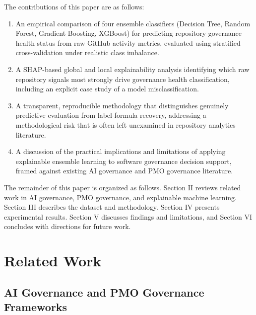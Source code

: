 \documentclass[conference]{IEEEtran}
\begin{document}
The contributions of this paper are as follows:

\begin{enumerate}
\item An empirical comparison of four ensemble classifiers (Decision Tree, Random Forest,
Gradient Boosting, XGBoost) for predicting repository governance health status from
raw GitHub activity metrics, evaluated using stratified cross-validation under
realistic class imbalance.
\item A SHAP-based global and local explainability analysis identifying which raw
repository signals most strongly drive governance health classification, including
an explicit case study of a model misclassification.
\item A transparent, reproducible methodology that distinguishes genuinely predictive
evaluation from label-formula recovery, addressing a methodological risk that is
often left unexamined in repository analytics literature.
\item A discussion of the practical implications and limitations of applying explainable
ensemble learning to software governance decision support, framed against existing
AI governance and PMO governance literature.
\end{enumerate}

The remainder of this paper is organized as follows. Section II reviews related work in
AI governance, PMO governance, and explainable machine learning. Section III describes
the dataset and methodology. Section IV presents experimental results. Section V
discusses findings and limitations, and Section VI concludes with directions for future
work.

\section{Related Work}

\subsection{AI Governance and PMO Governance Frameworks}
\end{document}
